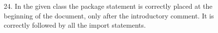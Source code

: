 \begin{itemize}
\item [24.] In the given class the package statement is correctly placed at the beginning of the document, only after the introductory comment. It is correctly followed by all the import statements.
\end{itemize}